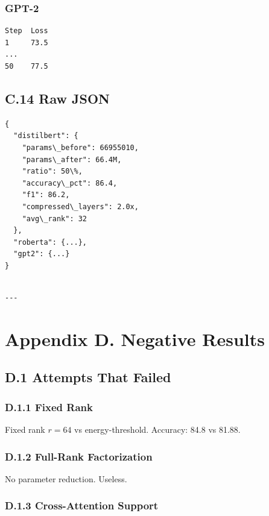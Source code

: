 \subsubsection{GPT-2}
\begin{lstlisting}
Step  Loss
1     73.5
...
50    77.5
\end{lstlisting}

\subsection{C.14 Raw JSON}

\begin{lstlisting}
{
  "distilbert": {
    "params\_before": 66955010,
    "params\_after": 66.4M,
    "ratio": 50\%,
    "accuracy\_pct": 86.4,
    "f1": 86.2,
    "compressed\_layers": 2.0x,
    "avg\_rank": 32
  },
  "roberta": {...},
  "gpt2": {...}
}
\end{lstlisting}
\begin{lstlisting}

---
\end{lstlisting}


\section{Appendix D. Negative Results}

\subsection{D.1 Attempts That Failed}

\subsubsection{D.1.1 Fixed Rank}

Fixed rank $r = 64$ vs energy-threshold. Accuracy: 84.8 vs 81.88.

\subsubsection{D.1.2 Full-Rank Factorization}

No parameter reduction. Useless.

\subsubsection{D.1.3 Cross-Attention Support}

